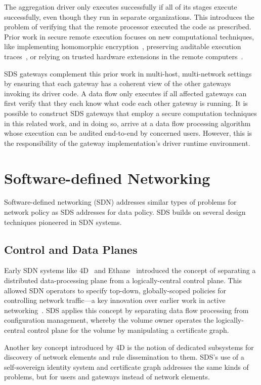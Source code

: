 The aggregation driver only executes successfully if all of its stages
execute successfully, even though they run in separate organizations.  This
introduces the problem of verifying that the remote processor executed the code
as prescribed.  Prior work in secure remote execution focuses on new
computational techniques, like implementing
homomorphic encryption~\cite{homomorphic-encryption}, preserving auditable
execution traces~\cite{versum}, or relying on trusted hardware extensions in
the remote computers~\cite{intel-sgx}.

SDS gateways complement this prior work in multi-host, multi-network settings by
ensuring that each gateway has a coherent view of the other gateways invoking
its driver code.  A data flow only executes if all affected gateways can first
verify that they each know what code each other gateway is running.  It is
possible to construct SDS gateways that employ a secure computation techniques
in this related work, and in doing so, arrive at a data flow processing algorithm
whose execution can be audited end-to-end by concerned users.  However, this is
the responsibility of the gateway implementation's driver runtime environment.

\section{Software-defined Networking}

Software-defined networking (SDN) addresses similar types of problems for
network policy as SDS addresses for data policy.  SDS builds on several design
techniques pioneered in SDN systems.

\subsection{Control and Data Planes}

Early SDN systems like
4D~\cite{4D} and Ethane~\cite{ethane} introduced the concept of separating a
distributed data-processing plane from a logically-central control plane.
This allowed SDN operators to specify top-down, globally-scoped policies for controlling
network traffic---a key innovation over earlier work in active
networking~\cite{road-to-sdn}.  SDS applies this concept by
separating data flow processing from configuration management, whereby the
volume owner operates the logically-central control plane for the
volume by manipulating a certificate graph.

Another key concept introduced by 4D is the notion of
dedicated subsystems for discovery of network elements and rule dissemination to
them.  SDS's use of a self-sovereign identity system and certificate graph
addresses the same kinds of problems, but for users and gateways instead of network
elements.

